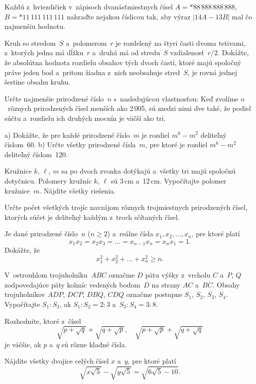 {%
Každú z~hviezdičiek v~zápisoch dvanásťmiestnych čísel
$A=*88\,888\,888\,888$, $B=*11\,111\,111\,111$ nahraďte
nejakou číslicou tak, aby výraz $|14A-13B|$ mal čo najmenšiu hodnotu.}

{%
Kruh so stredom~$S$ a~polomerom~$r$ je rozdelený na štyri časti dvoma tetivami, z~ktorých
jedna má dĺžku~$r$ a~druhá má od stredu~$S$
vzdialenosť~$r/2$. Dokážte, že absolútna hodnota rozdielu obsahov tých dvoch častí,
ktoré majú spoločný práve jeden bod a~pritom žiadna z~nich neobsahuje stred~$S$,
je rovná jednej šestine obsahu kruhu.}

{%
Určte najmenšie prirodzené číslo~$n$ s~nasledujúcou vlastnosťou: Keď zvolíme $n$~rôznych
prirodzených čísel menších ako 2\,005, sú medzi nimi dve také, že podiel súčtu
a~rozdielu ich druhých mocnín je väčší ako tri.}

{%
\ite a) Dokážte, že pre každé prirodzené číslo~$m$ je rozdiel $m^6-m^2$
deliteľný číslom~60.
\ite b) Určte všetky prirodzené čísla~$m$, pre ktoré je rozdiel $m^6-m^2$
deliteľný číslom~120.}

{%
Kružnice $k$, $\ell$, $m$ sa po dvoch zvonka dotýkajú a~všetky tri majú spoločnú dotyčnicu.
Polomery kružníc $k$, $\ell$ sú 3\,cm a~12\,cm. Vypočítajte polomer kružnice~$m$.
Nájdite všetky riešenia.}

{%
Určte počet všetkých trojíc navzájom rôznych trojmiestnych prirodzených čísel, ktorých súčet
je deliteľný každým z~troch sčítaných čísel.}

{%
Je dané prirodzené číslo~$n$ ($n\ge2$) a~reálne čísla $x_1,x_2,\dots,x_n$, pre ktoré platí
$$
x_1x_2=x_2x_3=\dots=x_{n-1}x_n=x_nx_1=1.
$$
Dokážte, že
$$
x_1^2+x_2^2+\dots+x_n^2\ge n.
$$}

{%
V~ostrouhlom trojuholníku~$ABC$ označme $D$ pätu výšky z~vrcholu $C$ a~$P$, $Q$
zodpovedajúce päty kolmíc vedených bodom~$D$ na strany $AC$ a~$BC$. Obsahy
trojuholníkov $ADP$, $DCP$, $DBQ$, $CDQ$ označme postupne $S_1$, $S_2$, $S_3$, $S_4$.
Vypočítajte $S_1:S_3$, ak $S_1:S_2=2:3$ a~$S_3:S_4=3:8$.}

{%
Rozhodnite, ktoré z~čísel
$$
\sqrt{p+\sqrt q}+\sqrt{q+\sqrt p}, \quad
\sqrt{p+\sqrt p}+\sqrt{q+\sqrt q}
$$
je väčšie, ak $p$ a~$q$ sú rôzne kladné čísla.}

{%
Nájdite všetky dvojice celých čísel $x$ a~$y$, pre ktoré platí
$$
\sqrt{x\sqrt5}-\sqrt{y\sqrt5}=\sqrt{6\sqrt5-10}.
$$}

